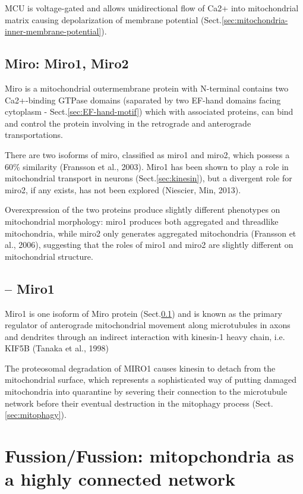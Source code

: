 MCU is voltage-gated and allows unidirectional flow of Ca2+ into mitochondrial
matrix causing depolarization of membrane potential
(Sect.\ref{sec:mitochondria-inner-membrane-potential}).


\subsection{Miro: Miro1, Miro2}
\label{sec:Miro}
\label{sec:Miro2}

Miro is a mitochondrial outermembrane protein with N-terminal contains two
Ca2+-binding GTPase domains (saparated by two EF-hand domains facing cytoplasm -
Sect.\ref{sec:EF-hand-motif}) which with associated proteins, can bind and
control the protein involving in the retrograde and anterograde transportations.

There are two isoforms of miro, classified as miro1 and miro2, which possess a
60\% similarity (Fransson et al., 2003).
Miro1 has been shown to play a role in mitochondrial transport in neurons
(Sect.\ref{sec:kinesin}), but a divergent role for miro2, if any exists, has not
been explored (Niescier, Min, 2013).

Overexpression of the two proteins produce slightly different phenotypes on
mitochondrial morphology: miro1 produces both aggregated and threadlike
mitochondria, while miro2 only generates aggregated mitochondria (Fransson et
al., 2006), suggesting that the roles of miro1 and miro2 are slightly different
on mitochondrial structure.

\subsection{-- Miro1}
\label{sec:Miro1}

Miro1 is one isoform of Miro protein (Sect.\ref{sec:Miro}) and is known as the
primary regulator of anterograde mitochondrial movement along microtubules in
axons and dendrites through an indirect interaction with kinesin-1 heavy chain,
i.e. KIF5B (Tanaka et al., 1998)

The proteosomal degradation of MIRO1 causes kinesin to detach from the
mitochondrial surface, which represents a sophisticated way of putting damaged
mitochondria into quarantine by severing their connection to the microtubule
network before their eventual destruction in the mitophagy process
(Sect.\ref{sec:mitophagy}).


\section{Fussion/Fussion: mitopchondria as a highly connected network}
\label{sec:fission-fusion}

